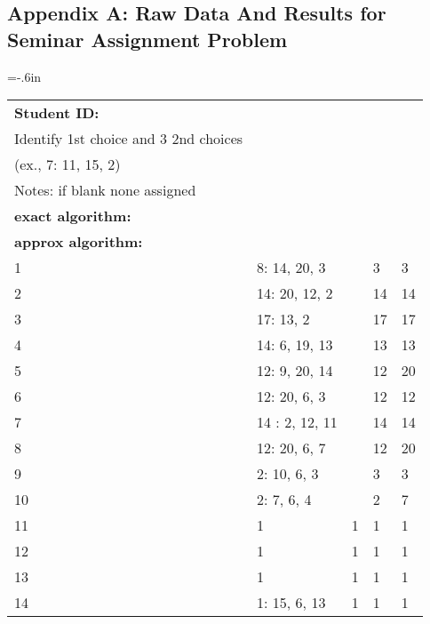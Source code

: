 \documentclass{article} %
\begin{document}
\subsection*{Appendix A: Raw Data And Results for Seminar Assignment Problem}
\hoffset=-.6in
\begin{longtable}{| l | l | l | l | l |}
\hline
        {\bf Student ID:} & \begin{tabular}{@{}c@{}}{\bf Student Selection:}\\ {\small Identify 1st choice and 3 2nd choices}\\(ex., 7:  11, 15, 2)\end{tabular}& \begin{tabular}{@{}c@{}}{\bf Assigned by Hand:}\\ {\footnotesize Notes: if blank none assigned}\end{tabular} & \begin{tabular}{@{}c@{}}{\bf Assigned by}\\{\bf exact algorithm:}\end{tabular} & \begin{tabular}{@{}c@{}}{\bf Assigned by}\\{\bf approx algorithm:}\end{tabular} \\ \hline
        1 & 8: 14, 20, 3 &  & 3 & 3 \\ \hline
        2 & 14: 20, 12, 2 &  & 14 & 14 \\ \hline
        3 & 17: 13, 2 &  & 17 & 17 \\ \hline
        4 & 14: 6, 19, 13 &  & 13 & 13 \\ \hline
        5 & 12: 9, 20, 14 &  & 12 & 20 \\ \hline
        6 & 12: 20, 6, 3 &  & 12 & 12 \\ \hline
        7 & 14 : 2, 12, 11 &  & 14 & 14 \\ \hline
        8 & 12: 20, 6, 7 &  & 12 & 20 \\ \hline
        9 & 2: 10, 6, 3 &  & 3 & 3 \\ \hline
        10 & 2: 7, 6, 4 &  & 2 & 7 \\ \hline
        11 & 1 & 1 & 1 & 1 \\ \hline
        12 & 1 & 1 & 1 & 1 \\ \hline
        13 & 1 & 1 & 1 & 1 \\ \hline
        14 & 1: 15, 6, 13 & 1 & 1 & 1 \\ \hline

\end{longtable}
\end{document}
